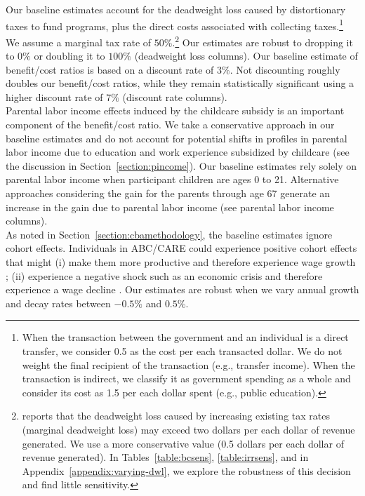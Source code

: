 \noindent Our baseline estimates account for the deadweight loss caused by distortionary taxes to fund programs, plus the direct costs associated with collecting taxes.\footnote{When the transaction between the government and an individual is a direct transfer, we consider 0.5 as the cost per each transacted dollar. We do not weight the final recipient of the transaction (e.g., transfer income). When the transaction is indirect, we classify it as government spending as a whole and consider its cost as 1.5 per each dollar spent (e.g., public education).} We assume a marginal tax rate of $50\%$.\footnote{\citet{Feldstein_1999_REStat} reports that the deadweight loss caused by increasing existing tax rates (marginal deadweight loss) may exceed two dollars per each dollar of revenue generated. We use a more conservative value (0.5 dollars per each dollar of revenue generated). In Tables~\ref{table:bcsens}, \ref{table:irrsens}, and in  Appendix~\ref{appendix:varying-dwl}, we explore the robustness of this decision and find little sensitivity.} Our estimates are robust to dropping it to $0\%$ or doubling it to $100\%$ (deadweight loss columns). Our baseline estimate of benefit/cost ratios is based on a discount rate of $3\%$. Not discounting roughly doubles our benefit/cost ratios, while they remain statistically significant using a higher discount rate of $7\%$ (discount rate columns).\\

\noindent Parental labor income effects induced by the childcare subsidy is an important component of the benefit/cost ratio. We take a conservative approach in our baseline estimates and do not account for potential shifts in profiles in parental labor income due to education and work experience subsidized by childcare (see the discussion in Section~\ref{section:pincome}). Our baseline estimates rely solely on parental labor income when participant children are ages 0 to 21. Alternative approaches considering the gain for the parents through age 67 generate an increase in the gain due to parental labor income (see parental labor income columns).\\

\noindent As noted in Section~\ref{section:cbamethodology}, the baseline estimates ignore cohort effects. Individuals in ABC/CARE could experience positive cohort effects that might (i) make them more productive and therefore experience wage growth \citep{Lagakos_Moll_etal_2016_LifeCycle_NBER}; (ii) experience a negative shock such as an economic crisis and therefore experience a wage decline \citep{Jarosch_2016_JobSecurity_Econometrica}. Our estimates are robust when we vary annual growth and decay rates between $-0.5\%$ and $0.5\%$.\\

